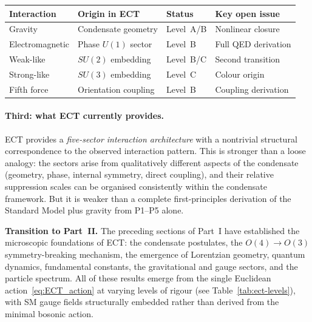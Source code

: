 \documentclass[11pt,a4paper]{article}
\numberwithin{equation}{section}
\begin{document}
\begin{center}
\renewcommand{\arraystretch}{1.2}
\begin{tabular}{p{3.5cm}p{3.0cm}p{3.0cm}p{2.8cm}}
\hline
Interaction & Origin in ECT & Status & Key open issue \\
\hline
Gravity & Condensate geometry & Level~A/B & Nonlinear closure \\
Electromagnetic & Phase $U(1)$ sector & Level~B & Full QED derivation \\
Weak-like & $SU(2)$ embedding & Level~B/C & Second transition \\
Strong-like & $SU(3)$ embedding & Level~C & Colour origin \\
Fifth force & Orientation coupling & Level~B & Coupling derivation \\
\hline
\end{tabular}
\end{center}

\paragraph{Third: what ECT currently provides.}
ECT provides a \emph{five-sector interaction architecture} with a
nontrivial structural correspondence to the observed interaction pattern.
This is stronger than a loose analogy: the sectors arise from
qualitatively different aspects of the condensate (geometry,
phase, internal symmetry, direct coupling), and their relative
suppression scales can be organised consistently within
the condensate framework.
But it is weaker than a complete first-principles derivation
of the Standard Model plus gravity from P1--P5 alone.

\bigskip
\noindent
\textbf{Transition to Part~II.}
The preceding sections of Part~I have established the microscopic
foundations of ECT: the condensate postulates, the $O(4)\to O(3)$
symmetry-breaking mechanism, the emergence of Lorentzian geometry,
quantum dynamics, fundamental constants, the gravitational and gauge
sectors, and the particle spectrum.  All of these results emerge from
the single Euclidean action~\eqref{eq:ECT_action} at varying levels
of rigour (see Table~\ref{tab:ect-levels}), with SM gauge fields
structurally embedded rather than derived from the minimal bosonic action.
\end{document}
